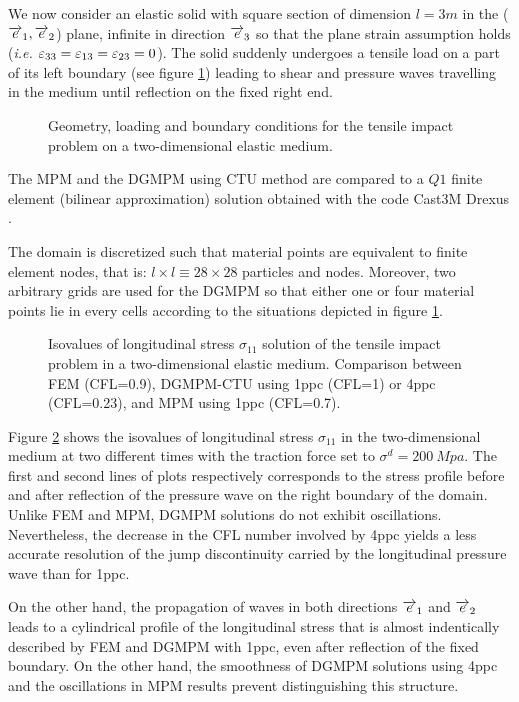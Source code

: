 We now consider an elastic solid with square section of dimension $l=3m$ in the (${\overrightarrow{e}}_1,{\overrightarrow{e}}_2$) plane, infinite in direction ${\overrightarrow{e}}_3$ so that the plane strain assumption holds (\textit{i.e. $\varepsilon_{33}=\varepsilon_{13}=\varepsilon_{23}=0$}). The solid suddenly undergoes a tensile load on a part of its left boundary (see figure \ref{fig:2D_planeStrain}) leading to shear and pressure waves travelling in the medium until reflection on the fixed right end.
\begin{figure}[h!]
  \centering
   \qquad
  \caption{Geometry, loading and boundary conditions for the tensile impact problem on a two-dimensional elastic medium.}
  \label{fig:2D_planeStrain}
\end{figure}
The MPM and the DGMPM using CTU method are compared to a $Q1$ finite element (bilinear approximation) solution obtained with the code Cast3M Drexus \cite{Castem}.

The domain is discretized such that material points are equivalent to finite element nodes, that is: $l\times l \equiv 28 \times 28$ particles and nodes. Moreover, two arbitrary grids are used for the DGMPM so that either one or four material points lie in every cells according to the situations depicted in figure \ref{fig:2D_planeStrain}.
\begin{figure}[h!]
  \centering
  
  \caption{Isovalues of longitudinal stress $\sigma_{11}$ solution of the tensile impact problem in a two-dimensional elastic medium. Comparison between FEM (CFL=0.9), DGMPM-CTU using 1ppc (CFL=1) or 4ppc (CFL=0.23), and MPM using 1ppc (CFL=0.7).}
  \label{fig:2delast_comparison}
\end{figure}
Figure \ref{fig:2delast_comparison} shows the isovalues of longitudinal stress $\sigma_{11}$ in the two-dimensional medium at two different times with the traction force set to $\sigma^d=200\: Mpa$. The first and second lines of plots respectively corresponds to the stress profile before and after reflection of the pressure wave on the right boundary of the domain.
Unlike FEM and MPM, DGMPM solutions do not exhibit oscillations. Nevertheless, the decrease in the CFL number involved by 4ppc yields a less accurate resolution of the jump discontinuity carried by the longitudinal pressure wave than for 1ppc.

On the other hand, the propagation of waves in both directions ${\overrightarrow{e}}_1$ and ${\overrightarrow{e}}_2$ leads to a cylindrical profile of the longitudinal stress that is almost indentically described by FEM and DGMPM with 1ppc, even after reflection of the fixed boundary. On the other hand, the smoothness of DGMPM solutions using 4ppc and the oscillations in MPM results prevent distinguishing this structure.




